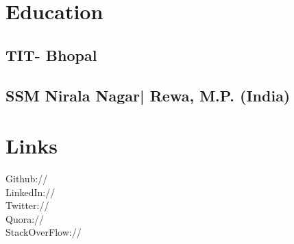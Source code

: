 \documentclass[]{prashant-resume-openfont}
\begin{document}
%
%
\lastupdated

%
%



%
%

\begin{minipage}[t]{0.33\textwidth} 


\section{Education} 

\subsection{TIT- Bhopal}
\sectionsep


\subsection{SSM Nirala Nagar| Rewa, M.P. (India)}
\sectionsep


\section{Links} 
Github:// \href{https://github.com/prashantdubey07}{} \\
LinkedIn://  \href{in.linkedin.com/in/prashantdubey07}{} \\
Twitter://  \href{https://twitter.com/prashantdubey07}{} \\
Quora://  \href{http://www.quora.com/Prashant-Dubey-28}{} \\
StackOverFlow://  \href{http://stackoverflow.com/users/2987706/prashant}{}
\sectionsep


\end{minipage}
\end{document}
